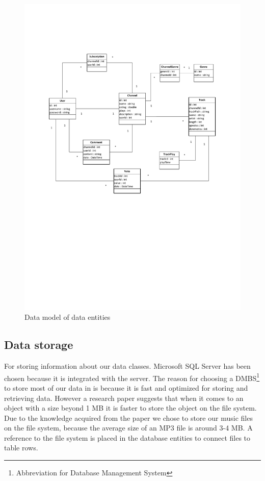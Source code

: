 \documentclass[a4paper,11pt,report]{article}
\begin{document}
{\begin{figure}[H]
\includegraphics[width=420pt,keepaspectratio=true,trim=60pt 300pt 60pt 80pt]{./ermodel.pdf}
\caption{Data model of data entities}
\end{figure}
\subsection{Data storage}
For storing information about our data classes. Microsoft SQL Server has been chosen because it is integrated with the server. The reason for choosing a DMBS\footnote[1]{Abbreviation for Database Management System} to store most of our data in is because it is fast and optimized for storing and retrieving data. However a research paper\cite{Russel} suggests that when it comes to an object with a size beyond 1 MB it is faster to store the object on the file system. Due to the knowledge acquired from the paper we chose to store our music files on the file system, because the average size of an MP3 file is around 3-4 MB. A reference to the file system is placed in the database entities to connect files to table rows.

}
\end{document}
